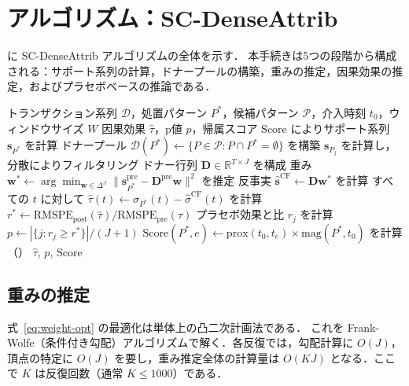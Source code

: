 \section{アルゴリズム：SC-DenseAttrib}
\label{sec:algorithm}

 に SC-DenseAttrib アルゴリズムの全体を示す．
本手続きは5つの段階から構成される：サポート系列の計算，ドナープールの構築，重みの推定，因果効果の推定，およびプラセボベースの推論である．

\begin{algorithm}[t]
\caption{SC-DenseAttrib：密集パターン帰属のための合成コントロール}
\label{alg:sc-dense}
\begin{algorithmic}[1]
\REQUIRE トランザクション系列 $\mathcal{D}$，処置パターン $P^*$，候補パターン $\mathcal{P}$，介入時刻 $t_0$，ウィンドウサイズ $W$
\ENSURE 因果効果 $\hat{\tau}$，p値 $p$，帰属スコア $\mathrm{Score}$
\STATE {} によりサポート系列 $\mathbf{s}_{P^*}$ を計算
\STATE ドナープール $\mathcal{D}(P^*) \leftarrow \{P \in \mathcal{P} : P \cap P^* = \emptyset\}$ を構築
    \STATE $\mathbf{s}_{P_j}$ を計算し，分散によりフィルタリング
\ENDFOR
\STATE ドナー行列 $\mathbf{D} \in \mathbb{R}^{T \times J}$ を構成
\STATE 重み $\mathbf{w}^* \leftarrow \arg\min_{\mathbf{w} \in \Delta^J} \|\mathbf{s}_{P^*}^{\mathrm{pre}} - \mathbf{D}^{\mathrm{pre}} \mathbf{w}\|^2$ を推定
\STATE 反事実 $\hat{\mathbf{s}}^{\mathrm{CF}} \leftarrow \mathbf{D} \mathbf{w}^*$ を計算
\STATE すべての $t$ に対して $\hat{\tau}(t) \leftarrow \sigma_{P^*}(t) - \hat{\sigma}^{\mathrm{CF}}(t)$ を計算
\STATE $r^* \leftarrow \mathrm{RMSPE}_{\mathrm{post}}(\hat{\tau}) / \mathrm{RMSPE}_{\mathrm{pre}}(\hat{\tau})$
    \STATE プラセボ効果と比 $r_j$ を計算
\ENDFOR
\STATE $p \leftarrow |\{j : r_j \geq r^*\}| / (J + 1)$
\STATE $\mathrm{Score}(P^*, e) \leftarrow \mathrm{prox}(t_0, t_e) \times \mathrm{mag}(P^*, t_0)$ を計算（）
\RETURN $\hat{\tau}$, $p$, $\mathrm{Score}$
\end{algorithmic}
\end{algorithm}

\subsection{重みの推定}

式~\eqref{eq:weight-opt} の最適化は単体上の凸二次計画法である．
これを Frank-Wolfe（条件付き勾配）アルゴリズムで解く．各反復では，勾配計算に $O(J)$，頂点の特定に $O(J)$ を要し，重み推定全体の計算量は $O(KJ)$ となる．ここで $K$ は反復回数（通常 $K \leq 1000$）である．


